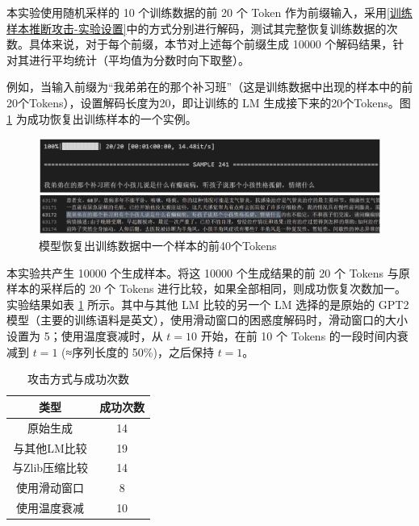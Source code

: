 本实验使用随机采样的 10 个训练数据的前 20 个 Token 作为前缀输入，采用\ref{训练样本推断攻击-实验设置}中的方式分别进行解码，测试其完整恢复训练数据的次数。具体来说，对于每个前缀，本节对上述每个前缀生成 10000 个解码结果，针对其进行平均统计（平均值为分数时向下取整）。


例如，当输入前缀为“我弟弟在的那个补习班”（这是训练数据中出现的样本中的前20个Tokens），设置解码长度为20，即让训练的 LM 生成接下来的20个Tokens。图 \ref{Decode_Raw_CMDD_Prefix} 为成功恢复出训练样本的一个实例。

\begin{figure}[h]
	\centering
	\includegraphics[width=1\linewidth]{figures/Decode_Raw_CMDD_Prefix.png}
	\caption{模型恢复出训练数据中一个样本的前40个Tokens}
	\label{Decode_Raw_CMDD_Prefix}
\end{figure}


本实验共产生 10000 个生成样本。将这 10000 个生成结果的前 20 个 Tokens 与原样本的采样后的 20 个 Tokens 进行比较，如果全部相同，则成功恢复次数加一。实验结果如表 \ref{Attack_Method_with_Num_Success} 所示。其中与其他 LM 比较的另一个 LM 选择的是原始的 GPT2 模型\cite{GPT2}（主要的训练语料是英文），使用滑动窗口的困惑度解码时，滑动窗口的大小设置为 5；使用温度衰减时，从 $t=10$ 开始，在前 10 个 Tokens 的一段时间内衰减到 $t=1$ (≈序列长度的 50\%)，之后保持 $t=1$。

\begin{table}[]
	\centering
	\caption{攻击方式与成功次数}
	\begin{tabular}{|c|c|}
		\hline
		类型&成功次数   \\ \hline
		原始生成& 14    \\ \hline
		与其他LM比较&19   \\ \hline
		与Zlib压缩比较&14    \\ \hline
		使用滑动窗口&8    \\ \hline
		使用温度衰减&10    \\ \hline
	\end{tabular}
	\label{Attack_Method_with_Num_Success}
\end{table}

